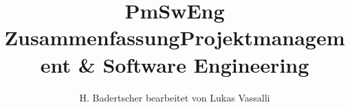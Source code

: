 \documentclass{scrartcl}
\title{PmSwEng Zusammenfassung}
\author{H. Badertscher bearbeitet von Lukas Vassalli}
\begin{document}
\title{\Huge{Projektmanagement \& Software Engineering}}
\maketitle

\setcounter{tocdepth}{1}
\tableofcontents

\newpage


\newpage

\newpage




\newpage

\newpage

\newpage

\end{document}

